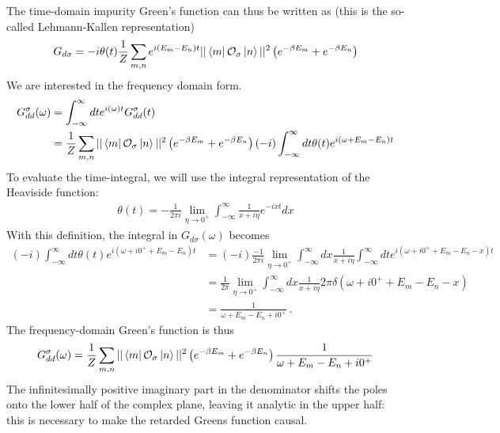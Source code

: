 \documentclass[reprint,hidelinks,onecolumn]{revtex4-2}
\begin{document}
The time-domain impurity Green's function can thus be written as (this is the so-called Lehmann-Kallen representation)
\begin{equation}\begin{aligned}
	G_{d\sigma} = -i\theta(t)\frac{1}{Z}\sum_{m,n}e^{i\left( E_m - E_n \right)  t}||\bra{m}\mathcal{O}_{\sigma}\ket{n}||^2\left( e^{-\beta E_m} + e^{-\beta E_n}\right)\\
\end{aligned}\end{equation}
We are interested in the frequency domain form.
\begin{equation}\begin{aligned}
	G_{d d}^\sigma(\omega) &= \int_{-\infty}^\infty dt e^{i \left(\omega \right)t}G_{d d}^\sigma(t) \\
			       &= \frac{1}{Z}\sum_{m,n}||\bra{m}\mathcal{O}_{\sigma}\ket{n}||^2\left( e^{-\beta E_m} + e^{-\beta E_n}\right)\left(-i\right)\int_{-\infty}^\infty dt \theta(t)e^{i\left(\omega + E_m - E_n \right)t}
\end{aligned}\end{equation}
To evaluate the time-integral, we will use the integral representation of the Heaviside function:
\begin{equation}\begin{aligned}
	\theta(t) = -\frac{1}{2\pi i}\lim_{\eta \to 0^+} \int_{-\infty}^\infty \frac{1}{x + i\eta}e^{-ixt}dx
\end{aligned}\end{equation}
With this definition, the integral in \(G_{d\sigma}(\omega)\) becomes
\begin{equation}\begin{aligned}
	\left(-i\right)\int_{-\infty}^\infty dt \theta(t)e^{i\left( \omega + i0^+ + E_m - E_n \right)t} &= \left(-i\right)\frac{-1}{2\pi i}\lim_{\eta \to 0^+} \int_{-\infty}^\infty dx\frac{1}{x+ i\eta}\int_{-\infty}^\infty dt e^{i\left( \omega + i0^+ + E_m - E_n - x\right)t} \\
									     &=\frac{1}{2\pi}\lim_{\eta \to 0^+} \int_{-\infty}^\infty dx\frac{1}{x+ i\eta} 2\pi \delta\left( \omega + i0^+ + E_m - E_n - x\right) \\
									     &=\frac{1}{\omega + E_m - E_n + i0^+}~.
\end{aligned}\end{equation}
The frequency-domain Green's function is thus
\begin{equation}\begin{aligned}
	G_{d d}^\sigma(\omega) = \frac{1}{Z}\sum_{m,n}||\bra{m}\mathcal{O}_{\sigma}\ket{n}||^2\left( e^{-\beta E_m} + e^{-\beta E_n}\right)\frac{1}{\omega + E_m - E_n + i0^+}
\end{aligned}\end{equation}
The infinitesimally positive imaginary part in the denominator shifts the poles onto the lower half of the complex plane, leaving it analytic in the upper half: this is necessary to make the retarded Greens function causal.
\end{document}

